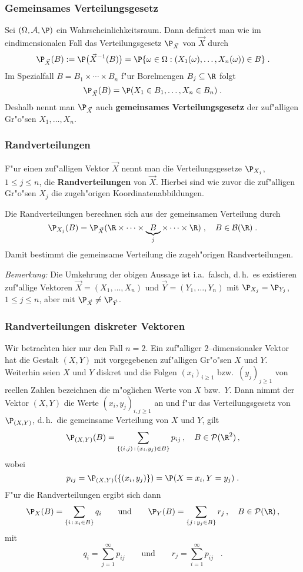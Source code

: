 \subsubsection{Gemeinsames Verteilungsgesetz}
Sei $(\Omega,\fr A,\P)$ ein Wahrscheinlichkeitsraum. Dann definiert
man wie im eindimensionalen Fall das Verteilungsgesetz $\P_{\vec X}$ von $\vec X$
durch
$$
\P_{\vec X}(B):=\P\big(\vec X^{-1}(B)\big)=\P\{\omega\in\Omega : (X_1(\omega),\ldots,X_n(\omega))\in B\}\;.
$$
Im Spezialfall $B=B_1\times\cdots\times B_n$ f"ur Borelmengen $B_j\subseteq\R$ folgt
$$
\P_{\vec X}(B)=\P(X_1\in B_1,\ldots, X_n\in B_n)\;.
$$
Deshalb nennt man $\P_{\vec X}$ auch \textbf{gemeinsames Verteilungsgesetz} der zuf"alligen
Gr"o"sen $X_1,\ldots,X_n$.
\subsubsection{Randverteilungen}
F"ur einen zuf"alligen Vektor $\vec X$ nennt man die Verteilungsgesetze $\P_{X_j}$, $1\le j\le n$,
die \textbf{Randverteilungen} von $\vec X$. Hierbei sind wie zuvor die zuf"alligen Gr"o"sen $X_j$ die
zugeh"origen Koordinatenabbildungen.
\begin{thm}
Die Randverteilungen berechnen sich aus der gemeinsamen Verteilung durch
$$
\P_{X_j}(B)= \P_{\vec X}(\R\times\cdots\times \underbrace{B}_j\times\cdots\times\R)\;,\quad B\in\fr B(\R)\;.
$$
Damit bestimmt die gemeinsame Verteilung die zugeh"origen Randverteilungen.
\end{thm}
\textit{Bemerkung:} Die Umkehrung der obigen Aussage ist i.a.~falsch, d.\,h.~es existieren zuf"allige
Vektoren $\vec X=(X_1,\ldots,X_n)$ und $\vec Y=(Y_1,\ldots, Y_n)$ mit $\P_{X_j}=\P_{Y_j}$,
$1\le j\le n$, aber mit $\P_{\vec X}\not=\P_{\vec Y}$.
\subsubsection{Randverteilungen diskreter Vektoren}
\label{disk}
Wir betrachten hier nur den Fall $n=2$. Ein zuf"alliger $2$--dimensionaler Vektor hat die Gestalt
$(X,Y)$ mit vorgegebenen zuf"alligen Gr"o"sen $X$ und $Y$. Weiterhin seien $X$ und $Y$ diskret und die
Folgen
$(x_i)_{i\ge 1}$ bzw.~$(y_j)_{j\ge 1}$ von reellen Zahlen bezeichnen  die m"oglichen Werte von $X$ bzw.~$Y$.
Dann nimmt der Vektor $(X,Y)$ die Werte $(x_i,y_j)_{i,j\ge 1}$ an und f"ur das Verteilungsgesetz
von $\P_{(X,Y)}$, d.\,h.~die gemeinsame Verteilung von $X$ und $Y$, gilt
$$
\P_{(X,Y)}(B)=\sum_{\{(i,j)\,:\, (x_i,y_j)\in B\}} p_{ij}\,,\quad B\in\fr P(\R^2)\,,
$$
wobei
$$
p_{ij}= \P_{(X,Y)}(\{(x_i,y_j)\})=\P(X=x_i,Y=y_j)\;.
$$
F"ur die Randverteilungen ergibt sich dann
$$
\P_X(B)=\sum_{\{i\,:\,x_i\in B\}} q_i \qquad\mbox{und}\qquad
\P_Y(B)=\sum_{\{j\,:\,y_j\in B\}} r_j\,,\quad B\in\fr P(\R)\,,
$$
mit
$$
q_i=\sum_{j=1}^\infty p_{ij}\qquad\mbox{und}\qquad r_j=\sum_{i=1}^\infty p_{ij}\;\;\;.
$$
